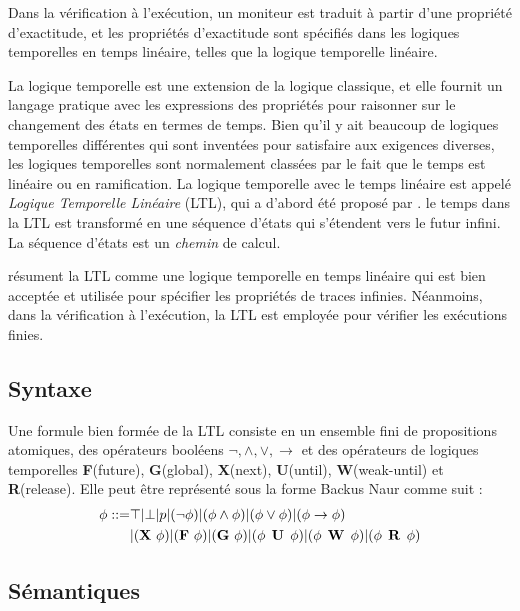 Dans la vérification à l'exécution, un moniteur est traduit à partir d'une propriété d'exactitude, et les propriétés d'exactitude sont spécifiés dans les logiques temporelles en temps linéaire, telles que la logique temporelle linéaire.

La logique temporelle est une extension de la logique classique, et elle fournit un langage pratique avec les expressions des propriétés pour raisonner sur le changement des états en termes de temps. Bien qu'il y ait beaucoup de logiques temporelles différentes qui sont inventées pour satisfaire aux exigences diverses, les logiques temporelles sont normalement classées par le fait que le temps est linéaire ou en ramification. La logique temporelle avec le temps linéaire est appelé \emph{Logique Temporelle Linéaire} (LTL), qui a d'abord été proposé par \cite{pnueli97}. le temps dans la LTL est transformé en une séquence d'états qui s'étendent vers le futur infini. La séquence d'états est un \emph{chemin} de calcul. \citep{clarke1999model} \cite{huth2004}

\cite{leucker2009brief} résument la LTL comme une logique temporelle en temps linéaire qui est bien acceptée et utilisée pour spécifier les propriétés de traces infinies. Néanmoins, dans la vérification à l'exécution, la LTL est employée pour vérifier les exécutions finies.

\subsection{Syntaxe}

Une formule bien formée de la LTL consiste en un ensemble fini de propositions atomiques, des opérateurs booléens $\neg, \wedge, \vee, \rightarrow$ et des opérateurs de logiques temporelles \textbf{F}(future), \textbf{G}(global), \textbf{X}(next), \textbf{U}(until), \textbf{W}(weak-until) et \textbf{R}(release). Elle peut être représenté sous la forme Backus Naur comme suit \citep{huth2004}:
\begin{align}
\phi ::= & \top | \bot | p | (\neg\phi) | (\phi \wedge \phi) | (\phi \vee \phi) | (\phi \rightarrow \phi) \nonumber \\
& | (\mathop{\mbox{\textbf{X}}}\, \phi) | (\mathop{\mbox{\textbf{F}}}\, \phi) | (\mathop{\mbox{\textbf{G}}}\, \phi) | (\phi \mathrel{\mbox{\,\textbf{U}}}\, \phi) | (\phi \mathrel{\mbox{\,\textbf{W}}}\, \phi) | (\phi \mathrel{\mbox{\,\textbf{R}}}\, \phi)
\end{align}

\subsection{Sémantiques}

